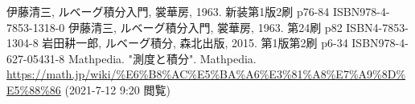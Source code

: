 \documentclass[dvipdfmx]{jsarticle}
\begin{document}
\begin{thebibliography}{50}
  伊藤清三, ルベーグ積分入門, 裳華房, 1963. 新装第1版2刷 p76-84 ISBN978-4-7853-1318-0
  伊藤清三, ルベーグ積分入門, 裳華房, 1963. 第24刷 p82 ISBN4-7853-1304-8
  岩田耕一郎, ルベーグ積分, 森北出版, 2015. 第1版第2刷 p6-34 ISBN978-4-627-05431-8
  Mathpedia. "測度と積分". Mathpedia. \url{https://math.jp/wiki/%E6%B8%AC%E5%BA%A6%E3%81%A8%E7%A9%8D%E5%88%86} (2021-7-12 9:20 閲覧)
\end{thebibliography}
\end{document}
